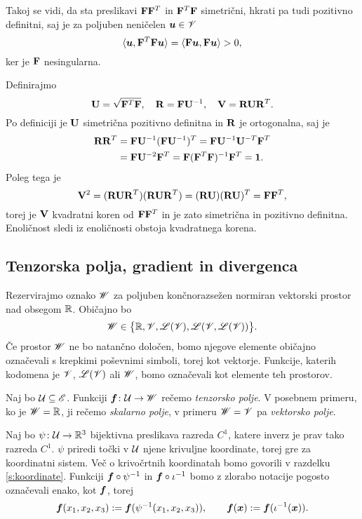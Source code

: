 \proof
	Takoj se vidi, da sta preslikavi $\mathbf F\mathbf F^T$ in $\mathbf F^T\mathbf F$
	simetrični, hkrati pa tudi pozitivno definitni, saj je za poljuben neničelen $\boldsymbol u\in\mathscr V$
	\[ 
		\langle\boldsymbol u,\mathbf F^T\mathbf F\boldsymbol u\rangle=\langle\mathbf F\boldsymbol u,\mathbf F\boldsymbol u\rangle>0,
	\]
	ker je $\mathbf F$ nesingularna.
	
	Definirajmo
	\begin{equation} \label{e:uandv}
		\mathbf U=\sqrt{\mathbf F^T\mathbf F},\quad\mathbf R=\mathbf F\mathbf U^{-1},\quad
		\mathbf V=\mathbf R\mathbf U\mathbf R^T.
	\end{equation}
	Po definiciji je $\mathbf U$ simetrična pozitivno definitna in $\mathbf R$ je ortogonalna, saj je
	\begin{align*}
		\mathbf R\mathbf R^T&=\mathbf F\mathbf U^{-1}(\mathbf F\mathbf U^{-1})^T
		=\mathbf F\mathbf U^{-1}\mathbf U^{-T}\mathbf F^T \\ &=\mathbf F\mathbf U^{-2}\mathbf F^T
		=\mathbf F(\mathbf F^T\mathbf F)^{-1}\mathbf F^T=\mathbf 1.
	\end{align*}
	Poleg tega je
	\[
		\mathbf V^2=(\mathbf R\mathbf U\mathbf R^T)(\mathbf R\mathbf U\mathbf R^T)
		=(\mathbf R\mathbf U)(\mathbf R\mathbf U)^T=\mathbf F\mathbf F^T,
	\]
	torej je $\mathbf V$ kvadratni koren od $\mathbf F\mathbf F^T$ in je zato
	simetrična in pozitivno definitna. Enoličnost sledi iz enoličnosti obstoja
	kvadratnega korena.
\endproof


\subsection{Tenzorska polja, gradient in divergenca}


Rezervirajmo oznako $\mathscr W$ za poljuben končnorazsežen normiran vektorski
prostor nad obsegom $\mathbb R$. Običajno bo
\[ \mathscr W\in\big\{ \mathbb R,\mathscr V,\mathscr L(\mathscr V),\mathscr L(\mathscr V,\mathscr L(\mathscr V)) \big\}. \]
Če prostor $\mathscr W$ ne bo natančno določen, bomo njegove elemente običajno označevali s krepkimi poševnimi simboli, torej kot vektorje.
Funkcije, katerih kodomena je $\mathscr V$, $\mathscr L(\mathscr V)$ ali $\mathscr W$, bomo označevali kot elemente teh prostorov.

Naj bo $\mathcal U\subseteq\mathscr E$. Funkciji $\boldsymbol f\colon \mathcal U\to\mathscr W$ rečemo \emph{tenzorsko polje}.
V posebnem primeru, ko je $\mathscr W=\mathbb R$, ji rečemo \emph{skalarno polje},
v primeru $\mathscr W=\mathscr V$ pa \emph{vektorsko polje}.

Naj bo $\psi\colon \mathcal U\to\mathbb R^3$ bijektivna preslikava razreda $C^1$, katere inverz je prav tako
razreda $C^1$. $\psi$ priredi točki v $\mathcal U$ njene krivuljne koordinate, torej gre za koordinatni sistem.
Več o krivočrtnih koordinatah bomo govorili v razdelku \ref{s:koordinate}.
Funkciji $\boldsymbol f\circ\psi^{-1}$ in $\boldsymbol f\circ\iota^{-1}$ bomo z zlorabo notacije pogosto
označevali enako, kot $\boldsymbol f$, torej
\[
	\boldsymbol f(x_1,x_2,x_3):=\boldsymbol f(\psi^{-1}(x_1,x_2,x_3)),\qquad
	\boldsymbol f(\boldsymbol x):=\boldsymbol f(\iota^{-1}(\boldsymbol x)).
\]

